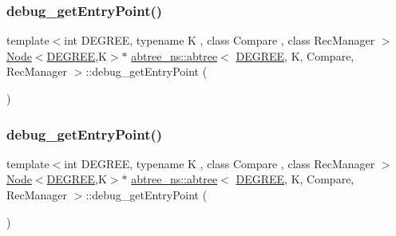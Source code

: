 \mbox{\label{classabtree__ns_1_1abtree_a71f2fd9b35b978c49e77f9e32c3436f3}} 
\subsubsection{\texorpdfstring{debug\+\_\+get\+Entry\+Point()}{debug\_getEntryPoint()}\hspace{0.1cm}{\footnotesize\ttfamily [1/2]}}
{\footnotesize\ttfamily template$<$int D\+E\+G\+R\+EE, typename K , class Compare , class Rec\+Manager $>$ \\
\hyperlink{structabtree__ns_1_1Node}{Node}$<$\hyperlink{brown__sigouin__abtree__kcas_2adapter_8h_a5d88b17d70c985f2f2b8e987037fd6dd}{D\+E\+G\+R\+EE},K$>$$\ast$ \hyperlink{classabtree__ns_1_1abtree}{abtree\+\_\+ns\+::abtree}$<$ \hyperlink{brown__sigouin__abtree__kcas_2adapter_8h_a5d88b17d70c985f2f2b8e987037fd6dd}{D\+E\+G\+R\+EE}, K, Compare, Rec\+Manager $>$\+::debug\+\_\+get\+Entry\+Point (\begin{DoxyParamCaption}{ }\end{DoxyParamCaption})\hspace{0.3cm}{\ttfamily [inline]}}

\mbox{\label{classabtree__ns_1_1abtree_a71f2fd9b35b978c49e77f9e32c3436f3}} 
\subsubsection{\texorpdfstring{debug\+\_\+get\+Entry\+Point()}{debug\_getEntryPoint()}\hspace{0.1cm}{\footnotesize\ttfamily [2/2]}}
{\footnotesize\ttfamily template$<$int D\+E\+G\+R\+EE, typename K , class Compare , class Rec\+Manager $>$ \\
\hyperlink{structabtree__ns_1_1Node}{Node}$<$\hyperlink{brown__sigouin__abtree__kcas_2adapter_8h_a5d88b17d70c985f2f2b8e987037fd6dd}{D\+E\+G\+R\+EE},K$>$$\ast$ \hyperlink{classabtree__ns_1_1abtree}{abtree\+\_\+ns\+::abtree}$<$ \hyperlink{brown__sigouin__abtree__kcas_2adapter_8h_a5d88b17d70c985f2f2b8e987037fd6dd}{D\+E\+G\+R\+EE}, K, Compare, Rec\+Manager $>$\+::debug\+\_\+get\+Entry\+Point (\begin{DoxyParamCaption}{ }\end{DoxyParamCaption})\hspace{0.3cm}{\ttfamily [inline]}}

